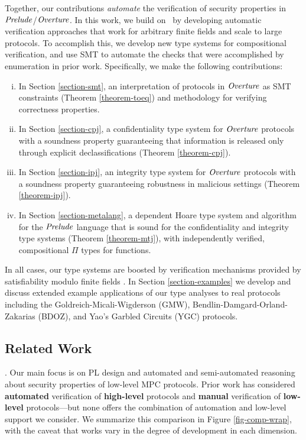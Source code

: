 Together, our contributions \emph{automate} the verification of security
properties in $\mathit{Prelude}$/$\mathit{Overture}$. In this work, we build on~\cite{skalka-near-ppdp24}
by developing automatic verification approaches that work for arbitrary
finite fields and scale to large protocols. To accomplish this, we develop new
type systems for compositional verification, and use SMT to automate the checks
that were accomplished by enumeration in prior work. Specifically, we make the
following contributions:
%
\begin{enumerate}[i.]
\item In Section \ref{section-smt}, an interpretation of protocols in
  $\mathit{Overture}$ as SMT constraints (Theorem \ref{theorem-toeq}) and
  methodology for verifying correctness properties.
\item In Section \ref{section-cpj}, a confidentiality type system for
  $\mathit{Overture}$ protocols with a soundness property guaranteeing that
  information is released only through explicit declassifications
  (Theorem \ref{theorem-cpj}).
\item In Section \ref{section-ipj}, an integrity type system for
  $\mathit{Overture}$ protocols with a soundness property guaranteeing
  robustness in malicious settings (Theorem \ref{theorem-ipj}).
\item In Section \ref{section-metalang}, a dependent Hoare type system and
  algorithm for the $\mathit{Prelude}$ language that is sound for the
  confidentiality and integrity type systems (Theorem
  \ref{theorem-mtj}), with independently verified, compositional $\Pi$
  types for functions.
\end{enumerate}
In all cases, our type systems are boosted by verification mechanisms
provided by satisfiability modulo finite fields \cite{SMFF}. In
Section \ref{section-examples} we develop and discuss extended example
applications of our type analyses to real protocols including
the Goldreich-Micali-Wigderson (GMW), Bendlin-Damgard-Orland-Zakarias
(BDOZ), and Yao's Garbled Circuits (YGC) protocols.

\subsection{Related Work}
\label{section-related-work}

.
Our main focus is on PL design and automated and semi-automated
reasoning about security properties of low-level MPC protocols. Prior
work has considered \textbf{automated} verification of
\textbf{high-level} protocols and \textbf{manual} verification of
\textbf{low-level} protocols---but none offers the combination of
automation and low-level support we consider.
%
We summarize this comparison in Figure
\ref{fig-comp-wrap}, with the caveat that works vary in the degree of
development in each dimension.

